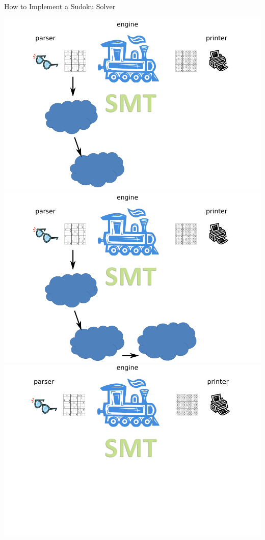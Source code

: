 \documentclass{beamer}
\begin{document}
\begin{frame}{How to Implement a Sudoku Solver}
\begin{overprint}
 \includegraphics[width=\textwidth]{current5}
 \includegraphics[width=\textwidth]{current6}
 \includegraphics[width=\textwidth]{current7}

\end{overprint}
\end{frame}
\end{document}
